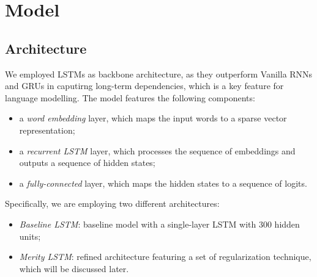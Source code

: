 \section{Model}
\label{sec:4_model}
 
\subsection{Architecture}
\label{sec:4_arch}
We employed LSTMs\cite{hochreiter1997lstm} as backbone architecture, as they outperform Vanilla RNNs and GRUs in caputirng long-term dependencies, which is a key feature for language modelling. The model features the following components:
\begin{itemize}
    \item a \emph{word embedding} layer, which maps the input words to a sparse vector representation;
    \item a \emph{recurrent LSTM} layer, which processes the sequence of embeddings and outputs a sequence of hidden states;
    \item a \emph{fully-connected} layer, which maps the hidden states to a sequence of logits.
\end{itemize}
Specifically, we are employing two different architectures:
\begin{itemize}
    \item \emph{Baseline LSTM}: baseline model with a single-layer LSTM with \(300\) hidden units;
    \item \emph{Merity LSTM}: refined architecture featuring a set of regularization technique, which will be discussed later.
\end{itemize}

